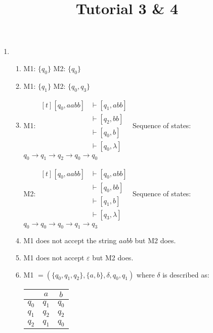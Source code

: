 \documentclass[a4paper, 12pt]{article}
\title{Tutorial 3 & 4}
\date{}
\author{}
\begin{document}
    \begin{enumerate}
        \item
        \begin{enumerate}
            \item M1: \( \{q_0\}\) M2: \(\{q_0\}\)
            \item M1: \(\{q_1\}\) M2: \( \{q_0, q_3\} \)
            \item M1: 
            $\begin{aligned}[t]
                [q_0, aabb] &\vdash [q_1, abb] \\
                &\vdash [q_2, bb] \\
                &\vdash [q_0, b] \\
                &\vdash [q_0, \lambda]
            \end{aligned}$ 
            \vspace{5pt} \newline
            Sequence of states: $q_0 \to q_1 \to q_2 \to q_0 \to q_0$  
            
            M2:
            $\begin{aligned}[t]
                [q_0, aabb] &\vdash [q_0, abb] \\
                &\vdash [q_0, bb] \\
                &\vdash [q_1, b] \\
                &\vdash [q_3, \lambda]
            \end{aligned}$ \hfill
            \vspace{5pt} \newline
            Sequence of states: $q_0 \to q_0 \to q_0 \to q_1 \to q_3$
            \item M1 does not accept the string \(aabb\) but M2 does.
            \item M1 does not accept \(\varepsilon\) but M2 does.
            \item M1 \(= (\{q_0, q_1, q_2\}, \{a, b\}, \delta, q_0, q_1)\) where \(\delta\) is described as: 
            \begin{center}
                
            \begin{tabular}{c|cc}
                 & $a$ & $b$ \\ \hline
            $q_0$ & $q_1$ & $q_0$ \\ 
            $q_1$ & $q_2$ & $q_2$ \\ 
            $q_2$ & $q_1$ & $q_0$
            \end{tabular}


\end{center}
\end{enumerate}
\end{enumerate}
\end{document}
